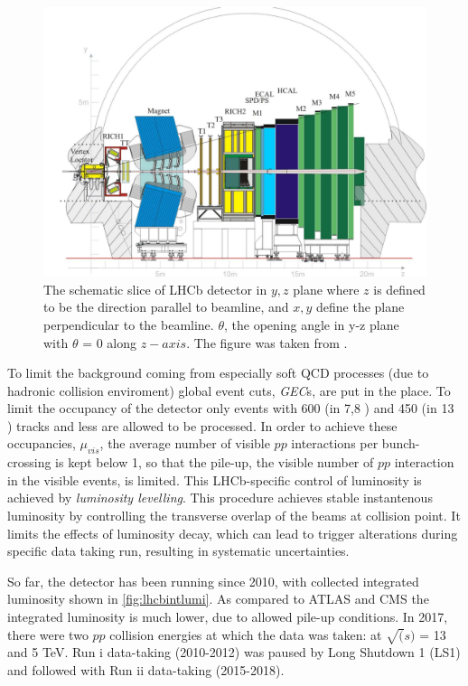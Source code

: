 \begin{figure}
	\centering
	\includegraphics[scale = 0.15]{figs/detector/lhcbdet.pdf}
	\caption{The schematic slice of LHCb detector in $y,z$ plane where $z$ is defined to be the direction parallel to beamline, and $x,y$ define the plane perpendicular to the beamline. $\theta$, the opening angle in y-z plane with $\theta$ = 0 along $z-axis$. The figure was taken from \cite{LHCbdetector}.}
	\label{fig:LHCbDetector}
\end{figure}


To limit the background coming from especially soft QCD processes (due to hadronic collision enviroment) global event cuts, \textit{GEC}s, are put in the place. To limit the occupancy of the detector only events with 600 (in 7,8 \tev) and 450 (in 13 \tev) tracks and less are allowed to be processed. In order to achieve these occupancies, $\mu_{vis}$, the average number of visible $pp$ interactions per bunch-crossing is kept below 1, so that the pile-up, the visible number of $pp$ interaction in the visible events, is limited. This LHCb-specific control of luminosity is achieved by \textit{luminosity levelling}. This procedure achieves stable instantenous luminosity by controlling the transverse overlap of the beams at collision point. It limits the effects of luminosity decay, which can lead to trigger alterations during specific data taking run, resulting in systematic uncertainties.

So far, the detector has been running since 2010, with collected integrated luminosity shown in \autoref{fig:lhcbintlumi}. As compared to \Gls{ATLAS} and \Gls{CMS} the integrated luminosity is much lower, due to allowed pile-up conditions. In 2017, there were two $pp$ collision energies at which the data was taken: at $\sqrt(s)$  = 13 and 5 TeV. Run \Rn{1} data-taking (2010-2012) was paused by Long Shutdown 1 (\Gls{LS1}) and followed with Run \Rn{2} data-taking (2015-2018). 

